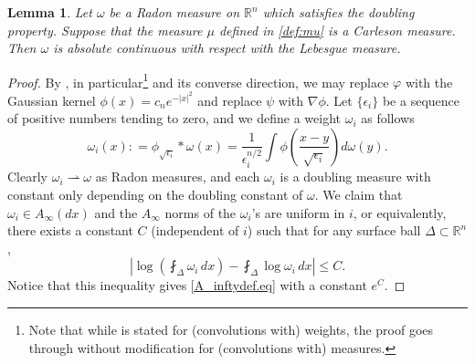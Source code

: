 \documentclass[11pt, a4paper,leqno]{amsart}
\theoremstyle{plain}
\newtheorem{lemma}[equation]{Lemma}
\theoremstyle{definition}
\theoremstyle{remark}
\numberwithin{equation}{section}
\begin{document}
\begin{lemma}\label{FKPabscty.thrm}
	Let $\omega$ be a Radon measure on $\mathbb{R}^n$ which satisfies the doubling property. Suppose that the measure $\mu$ defined in \eqref{def:mu} is a Carleson measure. Then $\omega$ is absolute continuous with respect with the Lebesgue measure.
\end{lemma}
\begin{proof}

By \cite{FKP}, in particular\footnote{Note that while \cite[Lemma 3.12]{FKP} is stated for (convolutions with) weights, the proof goes through without modification for (convolutions with) measures.} \cite[Lemma 3.12]{FKP} and its converse direction, we may replace $\varphi$ with the Gaussian kernel $\phi(x) = c_n e^{-|x|^2}$ and replace $\psi$ with $\nabla \phi$. Let $\{\epsilon_i\}$ be a sequence of positive numbers tending to zero, and we define a weight $\omega_i$ as follows
\begin{equation}\label{def:omegai}
	\omega_i(x): = \phi_{\sqrt{\epsilon_i}} \ast \omega(x) = \frac{1}{\epsilon_i^{n/2}} \int \phi\left( \frac{x-y}{\sqrt{\epsilon_i}} \right) d\omega(y). 
\end{equation} 
Clearly $\omega_i \rightharpoonup \omega$ as Radon measures, and each $\omega_i$ is a doubling measure with constant only depending on the doubling constant of $\omega$. 
We claim that $\omega_i \in A_\infty(dx)$ and the $A_\infty$ norms of the $\omega_i$'s are uniform in $i$, or equivalently, there exists a constant $C$ (independent of $i$) such that for any surface ball $\Delta \subset \mathbb{R}^n$,
\begin{equation}\label{eq:Ainfty}
	\left| \log \left( \fint_{\Delta} \omega_i \, dx \right) - \fint_{\Delta} \log \omega_i \, dx \right| \leq C. 
\end{equation} 
Notice that this inequality gives \eqref{A_inftydef.eq} with a constant $e^C$.



\end{proof}
\end{document}
